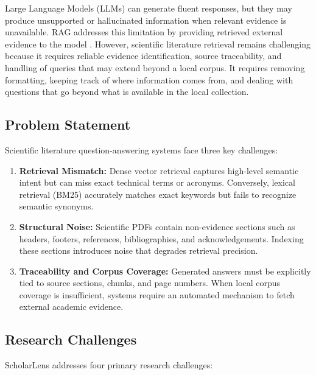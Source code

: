 \documentclass[conference]{IEEEtran}
\begin{document}
Large Language Models (LLMs) can generate fluent responses, but they may produce unsupported or hallucinated information when relevant evidence is unavailable. RAG addresses this limitation by providing retrieved external evidence to the model \cite{lewis2020retrieval, lala2023paperqa}. However, scientific literature retrieval remains challenging because it requires reliable evidence identification, source traceability, and handling of queries that may extend beyond a local corpus. It requires removing formatting, keeping track of where information comes from, and dealing with questions that go beyond what is available in the local collection.

\subsection{Problem Statement}

Scientific literature question-answering systems face three key challenges:

\begin{enumerate}
    \item \textbf{Retrieval Mismatch:} Dense vector retrieval captures high-level semantic intent but can miss exact technical terms or acronyms. Conversely, lexical retrieval (BM25) accurately matches exact keywords but fails to recognize semantic synonyms.
    
    \item \textbf{Structural Noise:} Scientific PDFs contain non-evidence sections such as headers, footers, references, bibliographies, and acknowledgements. Indexing these sections introduces noise that degrades retrieval precision.
    
    \item \textbf{Traceability and Corpus Coverage:} Generated answers must be explicitly tied to source sections, chunks, and page numbers. When local corpus coverage is insufficient, systems require an automated mechanism to fetch external academic evidence.
\end{enumerate}

\subsection{Research Challenges}

ScholarLens addresses four primary research challenges:
\end{document}
